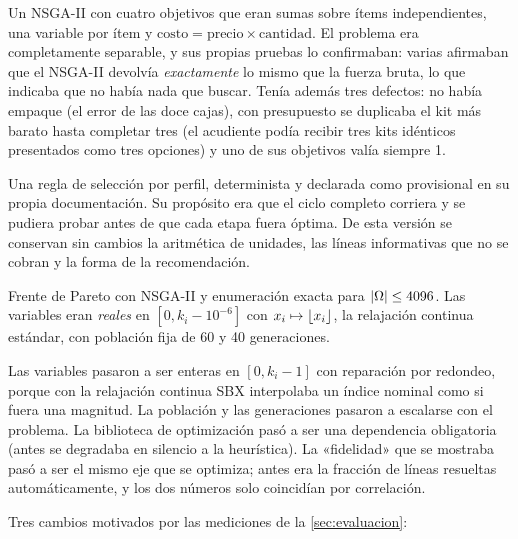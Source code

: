 \begin{evolucion}
\begin{description}[style=nextline,leftmargin=0pt]
  \item[v0 — Prototipo heredado.] Un NSGA-II con cuatro objetivos que eran
        sumas sobre ítems independientes, una variable por ítem y
        $\text{costo}=\text{precio}\times\text{cantidad}$. El problema era
        completamente separable, y sus propias pruebas lo confirmaban: varias
        afirmaban que el NSGA-II devolvía \emph{exactamente} lo mismo que la
        fuerza bruta, lo que indicaba que no había nada que buscar. Tenía
        además tres defectos: no había empaque (el error de las doce cajas),
        con presupuesto se duplicaba el kit más barato hasta completar tres
        (el acudiente podía recibir tres kits idénticos presentados como tres
        opciones) y uno de sus objetivos valía siempre 1.
  \item[v1 — Andamio heurístico.] Una regla de selección por perfil,
        determinista y declarada como provisional en su propia documentación.
        Su propósito era que el ciclo completo corriera y se pudiera probar
        antes de que cada etapa fuera óptima. De esta versión se conservan sin
        cambios la aritmética de unidades, las líneas informativas que no se
        cobran y la forma de la recomendación.
  \item[v2 — Primer NSGA-II.] Frente de Pareto con NSGA-II y enumeración
        exacta para $\left\lvert \Omega \right\rvert\leq4096$. Las variables eran \emph{reales} en
        $[0,k_i-10^{-6}]$ con $x_i\mapsto\left\lfloor x_i \right\rfloor$, la relajación continua
        estándar, con población fija de 60 y 40 generaciones.
  \item[v3 — Codificación entera.] Las variables pasaron a ser enteras en
        $[0,k_i-1]$ con reparación por redondeo, porque con la relajación
        continua SBX interpolaba un índice nominal como si fuera una magnitud.
        La población y las generaciones pasaron a escalarse con el problema.
        La biblioteca de optimización pasó a ser una dependencia obligatoria
        (antes se degradaba en silencio a la heurística). La «fidelidad» que se
        mostraba pasó a ser el mismo eje que se optimiza; antes era la
        fracción de líneas resueltas automáticamente, y los dos números solo
        coincidían por correlación.
  \item[v4 — Correcciones de la evaluación.] Tres cambios motivados por las
        mediciones de la \cref{sec:evaluacion}:

\end{description}
\end{evolucion}
